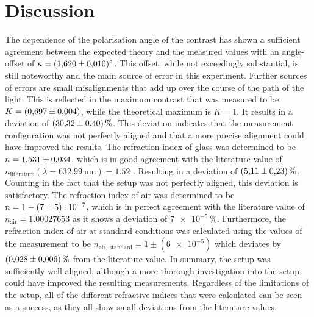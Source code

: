 \section{Discussion}
\label{sec:Discussion}

The dependence of the polarisation angle of the contrast has shown a sufficient agreement between the expected theory and the measured values with an angle-offset of $\kappa=\SI{1.620\pm 0.010}{\degree}$.
This offset, while not exceedingly substantial, is still noteworthy and the main source of error in this experiment.
Further sources of errors are small misalignments that add up over the course of the path of the light.
This is reflected in the maximum contrast that was measured to be $K= \SI{0.697\pm 0.004}{}$, while the theoretical maximum is $K=1$.
It results in a deviation of $\SI{30.32\pm0.4}{\percent}$. 
This deviation indicates that the measurement configuration was not perfectly aligned and that a more precise alignment could have improved the results. \newline
The refraction index of glass was determined to be $n=\num{1.531 \pm 0.034}$, which is in good agreement with the literature value of $n_{\text{literature}}(\lambda=\SI{632.99}{\nano\meter})=\num{1.52}$ \cite{RefractiveIndex}.
Resulting in a deviation of $\SI{5.11 (2.3)}{\percent}$.
Counting in the fact that the setup was not perfectly aligned, this deviation is satisfactory.
The refraction index of air was determined to be $n=1-\num{7 \pm 5 e-7}$, which is in perfect agreement with the literature value of $n_{\text{air}}=\num{1.00027653}$ \cite{RefractiveIndex} as it shows a deviation of $\SI{7e-5}{\percent}$.
Furthermore, the refraction index of air at standard conditions was calculated using the values of the measurement to be $n_{\text{air, standard}}=1\pm(\num{6e-5})$ which deviates by $\SI{0.028 (0.006)}{\percent}$ from the literature value. \newline
In summary, the setup was sufficiently well aligned, although a more thorough investigation into the setup could have improved the resulting measurements.
Regardless of the limitations of the setup, all of the different refractive indices that were calculated can be seen as a success, as they all show small deviations from the literature values.